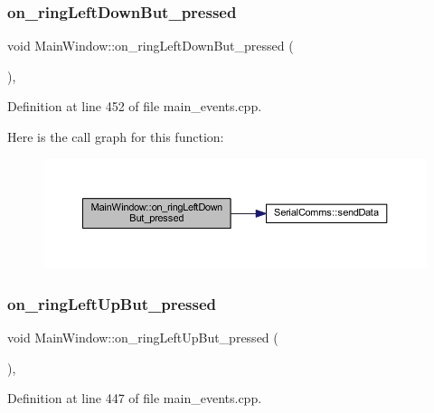 \subsubsection{\texorpdfstring{on\_ringLeftDownBut\_pressed}{on\_ringLeftDownBut\_pressed}}
{\footnotesize\ttfamily void Main\+Window\+::on\+\_\+ring\+Left\+Down\+But\+\_\+pressed (\begin{DoxyParamCaption}{ }\end{DoxyParamCaption})\hspace{0.3cm}{\ttfamily [private]}, {\ttfamily [slot]}}



Definition at line 452 of file main\+\_\+events.\+cpp.

Here is the call graph for this function\+:
\nopagebreak
\begin{figure}[H]
\begin{center}
\leavevmode
\includegraphics[width=350pt]{class_main_window_a125980000dd5d0e94dfc612b0d911267_cgraph}
\end{center}
\end{figure}
\mbox{\label{class_main_window_aefd08ff26ec69cb1a8c2da298e414742}} 
\subsubsection{\texorpdfstring{on\_ringLeftUpBut\_pressed}{on\_ringLeftUpBut\_pressed}}
{\footnotesize\ttfamily void Main\+Window\+::on\+\_\+ring\+Left\+Up\+But\+\_\+pressed (\begin{DoxyParamCaption}{ }\end{DoxyParamCaption})\hspace{0.3cm}{\ttfamily [private]}, {\ttfamily [slot]}}



Definition at line 447 of file main\+\_\+events.\+cpp.

